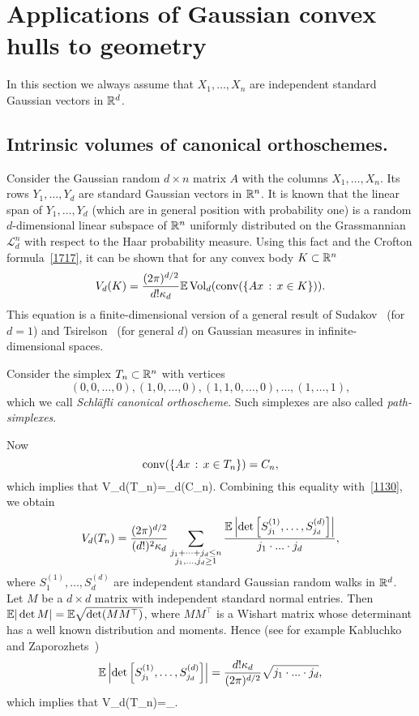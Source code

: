 \documentclass[12pt, reqno]{amsart}
\begin{document}
\section{Applications of Gaussian convex hulls to geometry}\label{1330}
In this section we always assume that $X_1, \dots, X_n$ are independent standard Gaussian vectors in $\mathbb{R}^d$. 

\subsection{Intrinsic volumes of canonical orthoschemes.} Consider the Gaussian random $d \times n$ matrix $A$ with the columns $X_1, \dots, X_n$. Its rows $Y_1, \dots , Y_d$ are standard Gaussian vectors in $\mathbb{R}^n$.
It is known that the linear span of $Y_1, \dots , Y_d$ (which are in general position with probability one) is a random $d$-dimensional linear subspace of $\mathbb{R}^n$ uniformly distributed on the Grassmannian $\mathcal{L}_d^n$ with respect to the Haar
probability measure. Using this fact and the Crofton formula~\eqref{1717}, it can be shown that for any convex body $K\subset\mathbb{R}^n$
$$
V_d(K)=\frac{(2\pi)^{d/2}}{d!\kappa_d}\mathbb{E}\mathop{\mathrm{Vol}}\nolimits_d(\mathop{\mathrm{conv}}\nolimits(\{Ax\,:\,x\in K\})).
$$
This equation is a finite-dimensional version of a general result of Sudakov~\cite{vS76} (for $d=1$) and Tsirelson~\cite{tsirelson_1, tsirelson_2, tsirelson_3} (for general $d$) on Gaussian measures in infinite-dimensional spaces.

Consider the simplex $T_n \subset \mathbb{R}^n$ with vertices
$$
(0,0,\dots,0),(1,0,\dots,0),(1,1,0,\dots,0),\dots,(1,\dots,1),
$$
which we call \emph{Schl\"afli canonical orthoscheme}. Such simplexes are also called {\it path-simplexes}.

Now
$$
\mathop{\mathrm{conv}}\nolimits(\{Ax\,:\,x\in T_n\})=C_n,
$$
which implies that
\be\label{1634}
V_d(T_n)=\E\Vol_d(C_n).
\ee
Combining this equality with~\eqref{1130}, we obtain 
$$
V_d(T_n)=\frac{(2\pi)^{d/2}}{(d!)^2\kappa_d}\sum_{\substack{j_1+\dots+j_{d}\leq n\\ j_1,\dots, j_{d}\geq1}}\frac{\mathbb{E}\left |\det\left[S^{(1)}_{j_1}, \dots, S^{(d)}_{j_d}\right] \right|}{j_1\cdot ... \cdot j_{d}},
$$
where $S^{(1)}_1, \dots, S^{(d)}_d$ are independent standard Gaussian random walks in $\mathbb{R}^d$. Let $M$ be a $d \times d$ matrix with independent standard normal entries. Then $\mathbb{E} |\det M| = \mathbb{E} \sqrt{\det (M M^\top)}$, where $M M^\top$ is a Wishart matrix whose determinant has a well known distribution and moments. Hence (see for example Kabluchko and Zaporozhets~\cite{KZ12})
$$
\mathbb{E}\left |\det\left[S^{(1)}_{j_1}, \dots, S^{(d)}_{j_{d}}\right] \right|= \frac{d!\kappa_d}{(2\pi)^{d/2}}\sqrt{j_1\cdot ... \cdot j_{d}},
$$
which implies that
\be\label{1449}
V_d(T_n)=\sum_{}.
\ee
\end{document}
